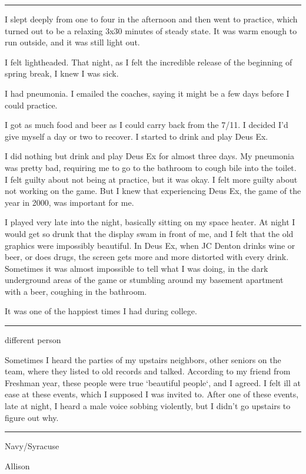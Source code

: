\plainfancybreak{12pt}{2}{* * *}

I slept deeply from one to four in the afternoon and then went to practice,
which turned out to be a relaxing 3x30 minutes of steady state.  It was warm
enough to run outside, and it was still light out.

I felt lightheaded.  That night, as I felt the incredible release of the
beginning of spring break, I knew I was sick.  

I had pneumonia.  I emailed the coaches, saying it might be a few days before I
could practice.

I got as much food and beer as I could carry back from the 7/11.  I decided I'd
give myself a day or two to recover.  I started to drink and play Deus Ex.  

I did nothing but drink and play Deus Ex for almost three days.  My pneumonia
was pretty bad, requiring me to go to the bathroom to cough bile into the
toilet.  I felt guilty about not being at practice, but it was okay.  I felt
more guilty about not working on the game.  But I knew that experiencing Deus
Ex, the game of the year in 2000, was important for me.

I played very late into the night, basically sitting on my space heater.  At
night I would get so drunk that the display swam in front of me, and I felt that
the old graphics were impossibly beautiful.  In Deus Ex, when JC Denton drinks
wine or beer, or does drugs, the screen gets more and more distorted with every
drink.  Sometimes it was almost impossible to tell what I was doing, in the dark
underground areas of the game or stumbling around my basement apartment with a
beer, coughing in the bathroom.

It was one of the happiest times I had during college.

\plainfancybreak{12pt}{2}{* * *}


different person

Sometimes I heard the parties of my upstairs neighbors, other seniors on the
team, where they listed to old records and talked.  According to my friend from
Freshman year, these people were true `beautiful people`, and I agreed.  I felt
ill at ease at these events, which I supposed I was invited to.  After one of
these events, late at night, I heard a male voice sobbing violently, but I
didn't go upstairs to figure out why.

\plainfancybreak{12pt}{2}{* * *}

Navy/Syracuse

Allison

